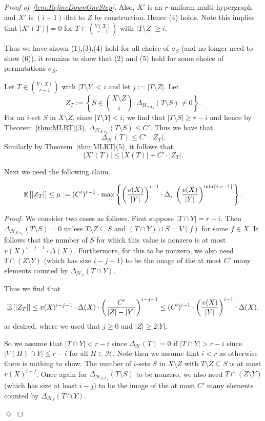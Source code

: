 \documentclass[11pt]{article}
\newcounter{i}
\theoremstyle{plain}
\newenvironment{proofclaim}[1][]%
{\noindent \emph{Proof.} {}{#1}{}}{\hfill
	$\Diamond$\vspace{1em}}
\renewcommand{\theclaim}{\thetheorem.\arabic{claim}}
\newenvironment{lateproof}[1]
 {%
  \renewcommand{\theclaim}{\ref{#1}.\arabic{claim}}%
  \begin{proof}[Proof of~\cref{#1}]%
 }
 {\end{proof}}
\theoremstyle{plain} %
\theoremstyle{definition}
\newcommand{\Expect}[1]{\ensuremath{%
\mathbb E\left[#1\right]
}}
\begin{document}
\begin{lateproof}{lem:RefineDownOneStep}
Also, $X'$ is an $r$-uniform multi-hypergraph and $X'$ is $(i-1)$-flat to $Z$ by construction. Hence (4) holds. Note this implies that $|X'(T)|=0$ for $T\in\binom{V(X)}{r-1}$ with $|T\setminus Z|\ge i$.%

Thus we have shown (1),(3),(4) hold for all choice of $\sigma_S$ (and no longer need to show (6)), it remains to show that (2) and (5) hold for some choice of permutations $\sigma_S$.

Let $T\in \binom{V(X)}{r-1}$ with $|T\setminus Y|<i$ and let $j:= |T\setminus Z|$. Let 
$$Z_T:= \left\{S\in \binom{X\setminus Z}{i}: \Delta_{H_{S,\sigma_S}}(T\setminus S)\ne 0\right\}.$$
For an $i$-set $S$ in $X\setminus Z$, since $|T\setminus Y| < i$, we find that $|T\setminus S|\ge r-i$ and hence by Theorem~\ref{thm:MLRT}(3), $\Delta_{\mathcal{H}_{S,\sigma_S}}(T\setminus S)\le C'$. Thus we have that
$$\Delta_{\mathcal{H}}(T) \le C'\cdot |Z_T|.$$
Similarly by Theorem~\ref{thm:MLRT}(5), it follows that
$$|X'(T)|\le |X(T)|+C'\cdot |Z_T|.$$

Next we need the following claim.

\begin{claim}\label{claim:Z}
$$\Expect{|Z_T|} \le \mu:= (C')^{r-1} \cdot \max\left\{\left(\frac{v(X)}{|Y|}\right)^{i-1} \cdot \Delta,~\left(\frac{v(X)}{|Y|}\right)^{\min\{i,r-1\}}\right\}.$$
\end{claim}
\begin{proofclaim}
We consider two cases as follows. First suppose $|T\cap Y|=r-i$. Then $\Delta_{\mathcal{H}_{S,\sigma_S}}(T\setminus S)=0$ unless $T\setminus Z \subseteq S$ and $(T\cap Y)\cup S=V(f)$ for some $f\in X$. It follows that the number of $S$ for which this value is nonzero is at most $v(X)^{i-j-1} \cdot \Delta(X)$. Furthermore, for this to be nonzero, we also need $T\cap (Z\setminus Y)$ (which has size $i-j-1$) to be the image of the at most $C'$ many elements counted by $\Delta_{\mathcal{H}_S}(T\cap Y)$. 

Thus we find that
$$\Expect{|Z_T|} \le v(X)^{i-j-1} \cdot \Delta(X)\cdot \left(\frac{C'}{|Z|-|Y|}\right)^{i-j-1} \le (C')^{i-1} \cdot \left(\frac{v(X)}{|Y|}\right)^{i-1} \cdot \Delta(X),$$
as desired, where we used that $j\ge 0$ and $|Z|\ge 2 |Y|$.

So we assume that $|T\cap Y| < r-i$ since $\Delta_{\mathcal{H}}(T)=0$ if $|T\cap Y|>r-i$ since $|V(H)\cap Y|\le r-i$ for all $H\in\mathcal{H}$. Note then we assume that $i<r$ as otherwise there is nothing to show. The number of $i$-sets $S$ in $X\setminus Z$ with $T\setminus Z \subseteq S$ is at most $v(X)^{i-j}$. Once again for $\Delta_{\mathcal{H}_{S,\sigma_S}}(T\setminus S)$ to be nonzero, we also need $T\cap (Z\setminus Y)$ (which has size at least $i-j$) to be the image of the at most $C'$ many elements counted by $\Delta_{\mathcal{H}_S}(T\cap Y)$. 


\end{proofclaim}
\end{lateproof}
\end{document}
